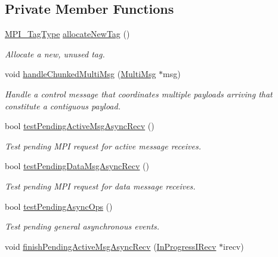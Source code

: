 \subsection*{Private Member Functions}
\begin{DoxyCompactItemize}
\item 
\hyperlink{namespacevt_1_1messaging_af700cb74b7b97c1a305267a9eb3ba91a}{M\+P\+I\+\_\+\+Tag\+Type} \hyperlink{structvt_1_1messaging_1_1_active_messenger_af2339f3300276bdc7e55706ce0cfff2a}{allocate\+New\+Tag} ()
\begin{DoxyCompactList}\small\item\em Allocate a new, unused tag. \end{DoxyCompactList}\item 
void \hyperlink{structvt_1_1messaging_1_1_active_messenger_a3ec09d3c055bee21bfd3d55a9c500b39}{handle\+Chunked\+Multi\+Msg} (\hyperlink{structvt_1_1messaging_1_1_multi_msg}{Multi\+Msg} $\ast$msg)
\begin{DoxyCompactList}\small\item\em Handle a control message that coordinates multiple payloads arriving that constitute a contiguous payload. \end{DoxyCompactList}\item 
bool \hyperlink{structvt_1_1messaging_1_1_active_messenger_a12133fda914a7809ac7ce7694efc312e}{test\+Pending\+Active\+Msg\+Async\+Recv} ()
\begin{DoxyCompactList}\small\item\em Test pending M\+PI request for active message receives. \end{DoxyCompactList}\item 
bool \hyperlink{structvt_1_1messaging_1_1_active_messenger_ae8e94c46cd2948864a97a671428b64bc}{test\+Pending\+Data\+Msg\+Async\+Recv} ()
\begin{DoxyCompactList}\small\item\em Test pending M\+PI request for data message receives. \end{DoxyCompactList}\item 
bool \hyperlink{structvt_1_1messaging_1_1_active_messenger_aa6828cf77adfd137f27e689a732363fa}{test\+Pending\+Async\+Ops} ()
\begin{DoxyCompactList}\small\item\em Test pending general asynchronous events. \end{DoxyCompactList}\item 
void \hyperlink{structvt_1_1messaging_1_1_active_messenger_a162667e5566546402f12baf8cf60d4da}{finish\+Pending\+Active\+Msg\+Async\+Recv} (\hyperlink{structvt_1_1messaging_1_1_in_progress_i_recv}{In\+Progress\+I\+Recv} $\ast$irecv)

\end{DoxyCompactItemize}

